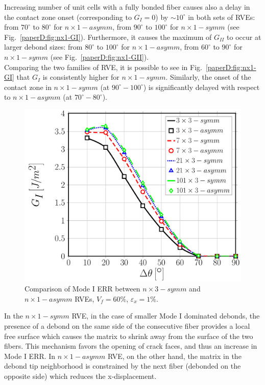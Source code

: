 Increasing number of unit cells with a fully bonded fiber causes also a delay in the contact zone onset (corresponding to $G_{I}=0$) by $\sim10^{\circ}$  in both sets of RVEs: from $70^{\circ}$ to $80^{\circ}$ for $n \times 1-asymm$, from $90^{\circ}$ to $100^{\circ}$ for $n \times 1-symm$ (see Fig.~\ref{paperD:fig:nx1-GI}). Furthermore, it causes the maximum of $G_{II}$ to occur at larger debond sizes: from $80^{\circ}$ to $100^{\circ}$ for $n \times 1-asymm$, from $60^{\circ}$ to $90^{\circ}$ for $n \times 1-symm$ (see Fig.~\ref{paperD:fig:nx1-GII}).\\
Comparing the two families of RVE, it is possible to see in Fig.~\ref{paperD:fig:nx1-GI} that $G_{I}$ is consistently higher for $n \times 1-symm$. Similarly, the onset of the contact zone in $n \times 1-symm$ (at $90^{\circ}-100^{\circ}$) is significantly delayed with respect to $n \times 1 - asymm$ (at $70^{\circ} − 80^{\circ}$). 

\begin{figure}[!htb]
\centering
  \includegraphics[width=\textwidth]{paperD/nxk-coupling-vf60-GI.pdf}
\caption{Comparison of Mode I ERR between $n \times 3−symm$ and $n \times 1−asymm$ RVEs, $V_{f}=60\%$, $\varepsilon_{x}=1\%$.}\label{paperD:fig:nxk-GI}
\end{figure}

In the $n \times 1−symm$ RVE, in the case of smaller Mode I dominated debonds, the presence of a debond on the same side of the consecutive fiber provides a local free surface which causes the matrix to shrink away from the surface of the two fibers.  This mechanism favors the opening of crack faces, and thus an increase in Mode I ERR. In $n \times 1−asymm$ RVE, on the other hand, the matrix in the debond tip neighborhood is constrained by the next fiber (debonded on the opposite side) which reduces the x-displacement.

